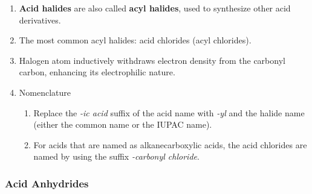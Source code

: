 \begin{enumerate}
    \item \textbf{Acid halides} are also called \textbf{acyl halides}, used to synthesize other acid derivatives.
    \item The most common acyl halides: acid chlorides (acyl chlorides).
    \item Halogen atom inductively withdraws electron density from the carbonyl carbon, enhancing its electrophilic nature.
    \item Nomenclature
    \begin{enumerate}
        \item Replace the \textit{-ic acid} suffix of the acid name with \textit{-yl} and the halide name (either the common name or the IUPAC name).
        \item For acids that are named as alkanecarboxylic acids, the acid chlorides are named by using the suffix \textit{-carbonyl chloride}.
    \end{enumerate}
\end{enumerate}
\begin{center}
     \quad
     \quad
     \quad
\end{center}

\subsubsection{Acid Anhydrides}

